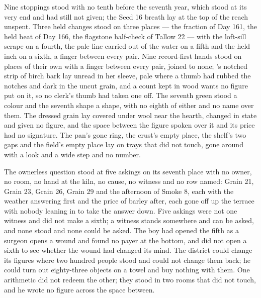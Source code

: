 Nine stoppings stood with no tenth before the seventh year, which stood at its very end and had still not given; the Seed 16 breath lay at the top of the reach unspent. Three held changes stood on three places --- the fraction of Day 161, the held beat of Day 166, the flagstone half-check of Tallow 22 --- with the loft-sill scrape on a fourth, the pale line carried out of the water on a fifth and the held inch on a sixth, a finger between every pair. Nine record-first hands stood on places of their own with a finger between every pair, joined to none; 's notched strip of birch bark lay unread in her sleeve, pale where a thumb had rubbed the notches and dark in the uncut grain, and a count kept in wood wants no figure put on it, so no clerk's thumb had taken one off. The seventh green stood a colour and the seventh shape a shape, with no eighth of either and no name over them. The dressed grain lay covered under wool near the hearth, changed in state and given no figure, and the space between the figure spoken over it and its price had no signature. The pan's gone ring, the crust's empty place, the shelf's two gaps and the field's empty place lay on trays that did not touch, gone around with a look and a wide step and no number.

The ownerless question stood at five askings on its seventh place with no owner, no room, no hand at the kiln, no cause, no witness and no row named: Grain 21, Grain 23, Grain 26, Grain 29 and the afternoon of Smoke 8, each with the weather answering first and the price of barley after, each gone off up the terrace with nobody leaning in to take the answer down. Five askings were not one witness and did not make a sixth; a witness stands somewhere and can be asked, and none stood and none could be asked. The boy had opened the fifth as a surgeon opens a wound and found no payer at the bottom, and did not open a sixth to see whether the wound had changed its mind. The district could change its figures where two hundred people stood and could not change them back; he could turn out eighty-three objects on a towel and buy nothing with them. One arithmetic did not redeem the other; they stood in two rooms that did not touch, and he wrote no figure across the space between.

